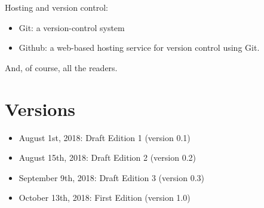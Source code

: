 \documentclass[12pt]{book}
\begin{document}
Hosting and version control:
\begin{itemize}
	\item Git: a version-control system
	\item Github: a web-based hosting service for version control using Git.
\end{itemize}

And, of course, all the readers.

\newpage
\chapter*{Versions}

\noindent
\begin{itemize}
	\item August 1st, 2018: \hspace{2cm} Draft Edition 1 (version 0.1)
	\item August 15th, 2018: \hspace{2cm} Draft Edition 2 (version 0.2)
	\item September 9th, 2018: \hspace{2cm} Draft Edition 3 (version 0.3)
	\item October 13th, 2018: \hspace{2cm} First Edition (version 1.0)
\end{itemize}



\ifx\wholebook\relax\else
% 
% 
	
\end{document}
